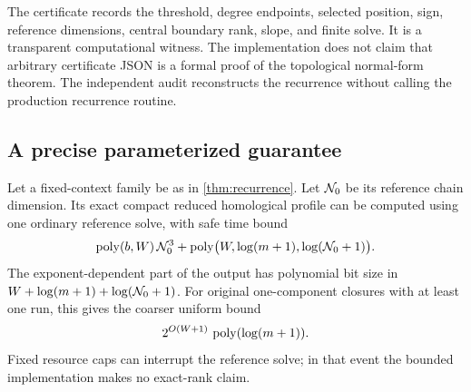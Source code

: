 The certificate records the threshold, degree endpoints, selected position,
sign, reference dimensions, central boundary rank, slope, and finite solve.
It is a transparent computational witness. The implementation does not
claim that arbitrary certificate JSON is a formal proof of the topological
normal-form theorem. The independent audit reconstructs the recurrence
without calling the production recurrence routine.

\subsection{A precise parameterized guarantee}

\begin{theorem}\label{thm:bit-cost}
Let a fixed-context family be as in \cref{thm:recurrence}. Let \(\mathcal N_0\)
be its reference chain dimension. Its exact compact reduced homological
profile can be computed using one ordinary reference solve, with safe
time bound
\begin{equation}\label{eq:reference-time}
\operatorname{poly}(b,W)\,\mathcal N_0^3+\operatorname{poly}\bigl(W,\log(m+1),\log(\mathcal N_0+1)\bigr).
\end{equation}
The exponent-dependent part of the output has polynomial bit size in
\(W+\log(m+1)+\log(\mathcal N_0+1)\).
For original one-component closures with at least one run, this gives the
coarser uniform bound
\begin{equation}\label{eq:context-exp}
2^{O(W+1)}\,\operatorname{poly}(\log(m+1)).
\end{equation}
Fixed resource caps can interrupt the reference solve; in that event the
bounded implementation makes no exact-rank claim.
\end{theorem}

